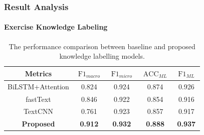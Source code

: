 \documentclass[10pt,aspectratio=43,mathserif]{beamer}
\begin{document}
\begin{frame}
	\frametitle{Result Analysis}
	\framesubtitle{Exercise Knowledge Labeling}
	\begin{table}[htbp!]
		\caption{The performance comparison between baseline and proposed knowledge labelling models.}\label{tbl:ch2-result-bsline1}
		\centering
		\begin{tabular}{ccccc}
			\toprule
			Metrics           & \(\operatorname{F1}_{macro}\) & \(\operatorname{F1}_{micro}\) & \(\operatorname{ACC}_{ML}\) & \(\operatorname{F1}_{ML}\) \\
			\midrule
			BiLSTM+Attention  & 0.824                         & 0.924                         & 0.874                       & 0.926                      \\
			fastText          & 0.846                         & 0.922                         & 0.854                       & 0.916                      \\
			TextCNN           & 0.761                         & 0.923                         & 0.857                       & 0.917                      \\
			\textbf{Proposed} & \textbf{0.912}                & \textbf{0.932}                & \textbf{0.888}              & \textbf{0.937}             \\
			\bottomrule
		\end{tabular}
	\end{table}
\end{frame}
\end{document}
